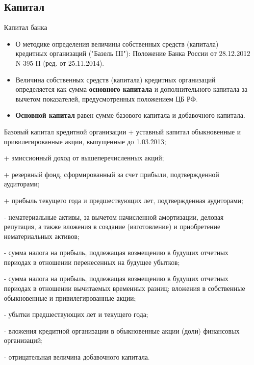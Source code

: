 \documentclass[_Banking_p2.tex]{subfiles}
\begin{document}
\subsection{Капитал}
\begin{frame}{Капитал банка}{}
\begin{itemize}[<+->]
\item
О методике определения величины собственных средств (капитала) кредитных организаций ("Базель III"): Положение Банка России от 28.12.2012 N 395-П (ред. от 25.11.2014).
\item
Величина собственных средств (капитала) кредитных организаций определяется как сумма \textbf{основного капитала }и дополнительного капитала за вычетом показателей, предусмотренных положением ЦБ РФ.
\item
\textbf{Основной капитал }равен сумме базового капитала и добавочного капитала.

\end{itemize}
\end{frame}
\begin{frame}[allowframebreaks]{Базовый капитал кредитной организации}
+ уставный капитал обыкновенные и привилегированные акции,  выпущенные до 1.03.2013;

+ эмиссионный доход от вышеперечисленных акций;

+ резервный фонд, сформированный за счет прибыли, подтвержденной аудиторами;

+ прибыль текущего года и предшествующих лет, подтвержденная аудиторами;

- нематериальные активы, за вычетом начисленной амортизации, деловая репутация, а также вложения в создание (изготовление) и приобретение нематериальных активов;

\pagebreak
- сумма налога на прибыль, подлежащая возмещению в будущих отчетных периодах в отношении перенесенных на будущее убытков;

- сумма налога на прибыль, подлежащая возмещению в будущих отчетных периодах в отношении вычитаемых временных разниц;
вложения в собственные обыкновенные и привилегированные акции;

- убытки предшествующих лет и текущего года;

- вложения кредитной организации в обыкновенные акции (доли) финансовых организаций;

- отрицательная величина добавочного капитала.


\end{frame}
\end{document}

